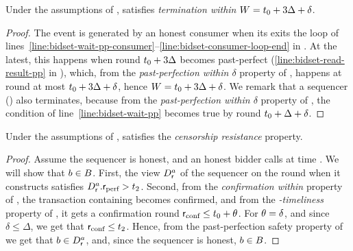 \begin{lemma}\label{lem:bidset-termination}
    Under the assumptions of ,  satisfies \emph{termination within $W = t_0 + 3\Delta + \delta$}.
\end{lemma}
\begin{proof}
    The \opResult{} event is generated by an honest consumer when its exits the loop of lines~\ref{line:bidset-wait-pp-consumer}--\ref{line:bidset-consumer-loop-end} in . At the latest, this happens when round $t_0 + 3\Delta$ becomes past-perfect (\cref{line:bidset-read-result-pp} in ), which, from the \emph{past-perfection within $\delta$} property of \podtm, happens at round at most $t_0 + 3\Delta + \delta$, hence $W = t_0 + 3\Delta + \delta$.
    We remark that a sequencer () also terminates, because from the \emph{past-perfection within $\delta$} property of \podtm, the condition of line~\ref{line:bidset-wait-pp} becomes true by round $t_0 + \Delta + \delta$.
\end{proof}

\begin{lemma}\label{lem:bidset-censorship}
    Under the assumptions of ,  satisfies the \emph{censorship resistance} property.
\end{lemma}
\begin{proof}
    Assume the sequencer is honest, and an honest bidder calls \opSubmitBid{\bid} at time \tzero. We will show that $b \in B$.
    First, the \podtm view $D_{\textsf{r}}^{a}$ of the sequencer \auc on the round \round when it constructs \bag satisfies $D_{\textsf{r}}^{a}.\textsf{r}_\text{perf} > t_2$.
    Second, from the \emph{confirmation within \parConf} property of \podtm, the transaction containing \bid becomes confirmed, and from the \emph{\parTemp-timeliness} property of \podtm, it gets a confirmation round $\textsf{r}_\text{conf} \leq t_0 + \theta$. For $\theta = \delta$, and since $\delta \leq \Delta$, we get that $\textsf{r}_\text{conf} \leq t_2$.
    Hence, from the past-perfection safety property of \podtm we get that $b \in D_{\textsf{r}}^{a}$, and, since the sequencer is honest, $b \in B$.
\end{proof}

